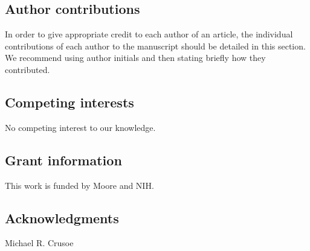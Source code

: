 \documentclass[10pt,a4paper,twocolumn]{article}
\begin{document}
\subsection*{Author contributions}
In order to give appropriate credit to each author of an article, the
individual contributions of each author to the manuscript should be
detailed in this section. We recommend using author initials and then
stating briefly how they contributed.

\subsection*{Competing interests}
No competing interest to our knowledge.

\subsection*{Grant information}
This work is funded by Moore and NIH.

\subsection*{Acknowledgments}
Michael R. Crusoe

{\small }

\bigskip








\end{document}
